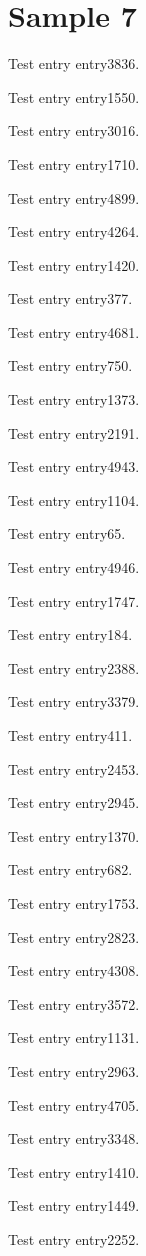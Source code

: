 \chapter{Sample 7}
Test entry \gls{entry3836}.

Test entry \gls{entry1550}.

Test entry \gls{entry3016}.

Test entry \gls{entry1710}.

Test entry \gls{entry4899}.

Test entry \gls{entry4264}.

Test entry \gls{entry1420}.

Test entry \gls{entry377}.

Test entry \gls{entry4681}.

Test entry \gls{entry750}.

Test entry \gls{entry1373}.

Test entry \gls{entry2191}.

Test entry \gls{entry4943}.

Test entry \gls{entry1104}.

Test entry \gls{entry65}.

Test entry \gls{entry4946}.

Test entry \gls{entry1747}.

Test entry \gls{entry184}.

Test entry \gls{entry2388}.

Test entry \gls{entry3379}.

Test entry \gls{entry411}.

Test entry \gls{entry2453}.

Test entry \gls{entry2945}.

Test entry \gls{entry1370}.

Test entry \gls{entry682}.

Test entry \gls{entry1753}.

Test entry \gls{entry2823}.

Test entry \gls{entry4308}.

Test entry \gls{entry3572}.

Test entry \gls{entry1131}.

Test entry \gls{entry2963}.

Test entry \gls{entry4705}.

Test entry \gls{entry3348}.

Test entry \gls{entry1410}.

Test entry \gls{entry1449}.

Test entry \gls{entry2252}.

